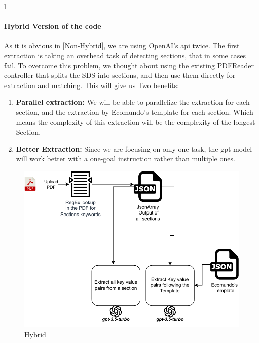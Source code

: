 l\documentclass[a4paper,12pt,twoside]{report}
\begin{document}
\paragraph{Hybrid Version of the code}
As it is obvious in \ref{Non-Hybrid}, we are using OpenAI's api twice. The first extraction is taking an overhead task of detecting sections, that in some cases fail. To overcome this problem, we thought about using the existing PDFReader controller that splits the SDS into sections, and then use them directly for extraction and matching. This will give us Two benefits:
\begin{enumerate}
\item \textbf{Parallel extraction:} We will be able to parallelize the extraction for each section, and the extraction by Ecomundo's template for each section. Which means the complexity of this extraction will be the complexity of the longest Section. 
\item \textbf{Better Extraction:} Since we are focusing on only one task, the gpt model will work better with a one-goal instruction rather than multiple ones.
\end{enumerate}
\begin{figure}[H]
		\includegraphics[width=\textwidth, keepaspectratio ]{images/hybrid}
	\caption[How the Hybrid code works]{Hybrid}
\label{Hybrid}
\end{figure}
\end{document}
